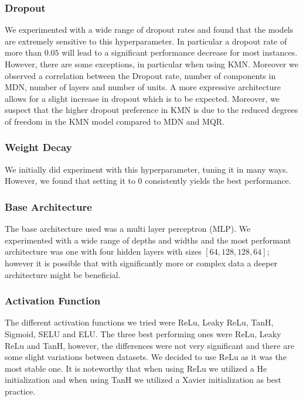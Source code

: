 \subsubsection{Dropout}

We experimented with a wide range of dropout rates and found that the models are extremely sensitive to this hyperparameter. In particular a dropout rate of more than $0.05$ will lead to a significant performance decrease for most instances. However, there are some exceptions, in particular when using KMN. Moreover we observed a correlation between the Dropout rate, number of components in MDN, number of layers and number of units. A more expressive architecture allows for a slight increase in dropout which is to be expected. Moreover, we suspect that the higher dropout preference in KMN is due to the reduced degrees of freedom in the KMN model compared to MDN and MQR.

\subsubsection{Weight Decay}

We initially did experiment with this hyperparameter, tuning it in many ways. However, we found that setting it to $0$ consistently yields the best performance.

\subsubsection{Base Architecture}

The base architecture used was a multi layer perceptron (MLP). We experimented with a wide range of depths and widths and the most performant architecture was one with four hidden layers with sizes $[64, 128, 128, 64]$; however it is possible that with significantly more or complex data a deeper architecture might be beneficial.

\subsubsection{Activation Function}

The different activation functions we tried were ReLu, Leaky ReLu, TanH, Sigmoid, SELU and ELU. The three best performing ones were ReLu, Leaky ReLu and TanH, however, the differences were not very significant and there are some slight variations between datasets. We decided to use ReLu as it was the most stable one. It is noteworthy that when using ReLu we utilized a He initialization and when using TanH we utilized a Xavier initialization as best practice.

